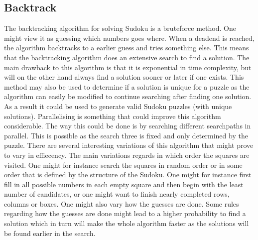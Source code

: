 \documentclass[a4paper,11pt]{kth-mag}
\begin{document}
\subsection{Backtrack}
The backtracking algorithm for solving Sudoku is a bruteforce method.
One might view it as guessing which numbers goes where.
When a deadend is reached, the algorithm backtracks to a earlier guess and tries something else.
This means that the backtracking algorithm does an extensive search to find a solution.
The main drawback to this algorithm is that it is exponential in time complexity, but will on the other hand always find a solution sooner or later if one exists.
This method may also be used to determine if a solution is unique for a puzzle as the algorithm can easily be modified to continue searching after finding one solution.
As a result it could be used to generate valid Sudoku puzzles (with unique solutions).
\newline
Parallelising is something that could improve this algorithm considerable.
The way this could be done is by searching different searchpaths in parallel. This is possible as the search three is fixed and only determined by the puzzle.
\newline
There are several interesting variations of this algorithm that might prove to vary in effiecency.
The main variations regards in which order the squares are visited.
One might for instance search the squares in random order or in some order that is defined by the structure of the Sudoku.
One might for instance first fill in all possible numbers in each empty square and then begin with the least number of candidates, or one might want to finish nearly completed rows, columns or boxes.
One might also vary how the guesses are done.
Some rules regarding how the guesses are done might lead to a higher probability to find a solution which in turn will make the whole algorithm faster as the solutions will be found earlier in the search.
\end{document}
